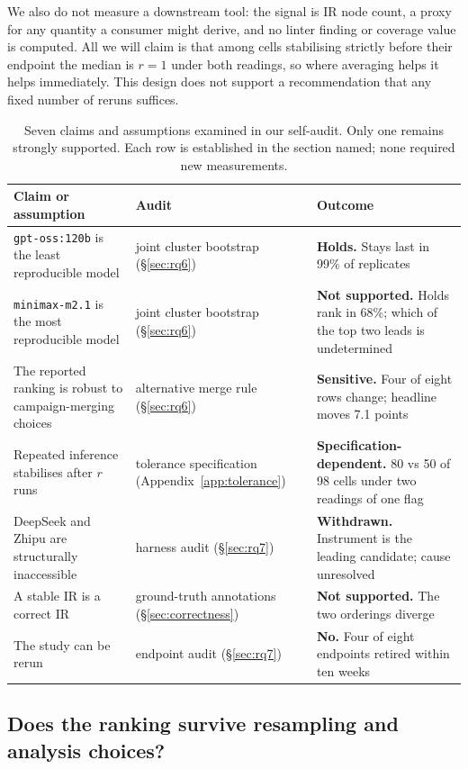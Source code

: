 \documentclass{article}
\begin{document}
We also do not measure a downstream tool: the signal is IR node count, a proxy for any quantity a consumer might derive, and no linter finding or coverage value is computed. All we will claim is that among cells stabilising strictly before their endpoint the median is $r=1$ under both readings, so where averaging helps it helps immediately. This design does not support a recommendation that any fixed number of reruns suffices.


\begin{table}[t]
\footnotesize
\setlength{\tabcolsep}{3pt}
\caption{Seven claims and assumptions examined in our self-audit. Only one remains strongly supported. Each row is established in the section named; none required new measurements.}
\label{tab:audit}
\begin{tabular}{@{}p{}p{}p{}@{}}
\toprule
Claim or assumption & Audit & Outcome \\
\midrule
\texttt{gpt-oss:120b} is the least reproducible model & joint cluster bootstrap (\S\ref{sec:rq6}) & \textbf{Holds.} Stays last in 99\% of replicates \\
\texttt{minimax-m2.1} is the most reproducible model & joint cluster bootstrap (\S\ref{sec:rq6}) & \textbf{Not supported.} Holds rank in 68\%; which of the top two leads is undetermined \\
The reported ranking is robust to campaign-merging choices & alternative merge rule (\S\ref{sec:rq6}) & \textbf{Sensitive.} Four of eight rows change; headline moves 7.1 points \\
Repeated inference stabilises after $r$ runs & tolerance specification (Appendix~\ref{app:tolerance}) & \textbf{Specification-dependent.} 80 vs 50 of 98 cells under two readings of one flag \\
DeepSeek and Zhipu are structurally inaccessible & harness audit (\S\ref{sec:rq7}) & \textbf{Withdrawn.} Instrument is the leading candidate; cause unresolved \\
A stable IR is a correct IR & ground-truth annotations (\S\ref{sec:correctness}) & \textbf{Not supported.} The two orderings diverge \\
The study can be rerun & endpoint audit (\S\ref{sec:rq7}) & \textbf{No.} Four of eight endpoints retired within ten weeks \\
\bottomrule
\end{tabular}
\end{table}


\subsection{Does the ranking survive resampling and analysis choices?}
\end{document}
